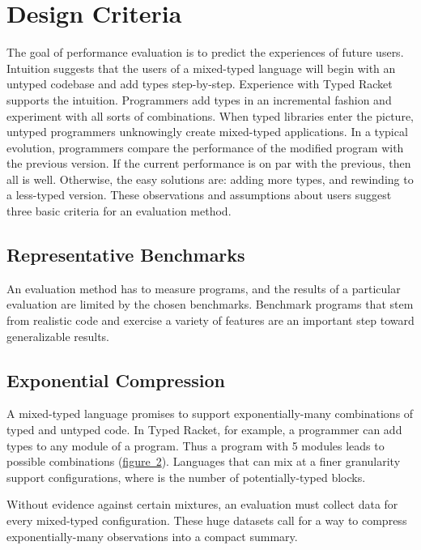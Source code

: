 \documentclass[ twoside,open=right,titlepage,numbers=noenddot,headinclude,%
                footinclude=true,cleardoublepage=empty,abstract=off,
                BCOR=5mm,paper=a4,fontsize=11pt,%
                ngerman,american,%
                parts,pdfspacing]{scrreprt}
\let\SOriginalthesubsubsection\thesubsubsection
\newcommand{\Ssubsection}[2]{\subsection[#1]{#2}\let\thesubsubsection\SOriginalthesubsubsection}
\newcommand{\Ssubsubsection}[2]{\subsubsection[#1]{#2}}
\newcommand{\FigureRef}[2]{#1}
\renewcommand{\Ssubsection}[2]{\section[#1]{#2}}
\renewcommand{\Ssubsubsection}[2]{\subsection[#1]{#2}}
\begin{document}
\Ssubsection{Design Criteria}{Design Criteria}\label{t:x28part_x22Designx5fCriteriax22x29}

The goal of performance evaluation is to predict the experiences of future
 users.
Intuition suggests that the users of a mixed{-}typed language will begin
 with an untyped codebase and add types step{-}by{-}step.
Experience with Typed Racket supports the intuition.
Programmers add types in an incremental fashion and experiment with all sorts of combinations.
When typed libraries enter the picture, untyped programmers unknowingly
 create mixed{-}typed applications.
In a typical evolution, programmers compare the performance of the modified
 program with the previous version.
If the current performance is on par with the previous, then all is well.
Otherwise, the easy solutions are: adding more types, and rewinding to a
 less{-}typed version.
These observations and assumptions about users suggest three basic criteria
 for an evaluation method.

\Ssubsubsection{Representative Benchmarks}{Representative Benchmarks}\label{t:x28part_x22Representativex5fBenchmarksx22x29}

An evaluation method has to measure programs, and the results of
 a particular evaluation are limited by the chosen benchmarks.
Benchmark programs that stem from realistic code and exercise a variety
 of features are an important step toward generalizable results.

\Ssubsubsection{Exponential Compression}{Exponential Compression}\label{t:x28part_x22Exponentialx5fCompressionx22x29}

A mixed{-}typed language promises to support exponentially{-}many combinations of
 typed and untyped code.
In Typed Racket, for example, a programmer can add types to any module of a program.
Thus a program with 5 modules leads to
  possible combinations (\hyperref[t:x28counter_x28x22figurex22_x22figx3aexamplex2dlatticex2d0x22x29x29]{figure~\FigureRef{2}{t:x28counter_x28x22figurex22_x22figx3aexamplex2dlatticex2d0x22x29x29}}).
Languages that can mix at a finer granularity support  configurations,
 where  is the number of potentially{-}typed blocks.

Without evidence against certain mixtures, an evaluation
 must collect data for every mixed{-}typed configuration.
These huge datasets call for a way to compress exponentially{-}many
 observations into a compact summary.
\end{document}
